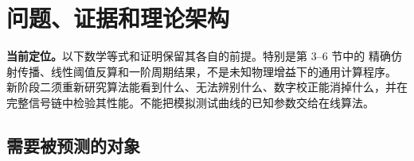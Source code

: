 \documentclass[11pt,a4paper]{ctexart}
\theoremstyle{adcplain}
\theoremstyle{definition}
\begin{document}
\begin{abstract}
这是旧三阶段路线的条件性理论底稿。四阶段新路线把完整逐级信号链和数字校准
闭环合入新的阶段二，并把真实模拟增益对在线算法未知作为基本问题。
本文中的合成模拟分段一次传输、辅路仿射副本和一阶建立均是另加的研究条件，
不能从旧实验的一致性推出实际芯片遵循这些条件。新理论的可辨识性、性能范围与
一般收敛保证尚待建立；本文不是这些问题的已完成答案。

本文建立一条从流水线 ADC 结构到性能指标的可解释理论链。ADC 首先被表示为
带逐级判决和连续内部电压的系统；在静态极限下，各级判决阈值把 ADC 输入域
划分为判决码固定的区间；区间内部的残余电压由所选模拟传输决定，仅在额外采用
局部分段一次模拟近似时才对输入呈一次关系。码宽、DNL、累计码密度
偏差、单调条件下的转换电平 INL、缺失码与
发生模拟过载或最终数字裁剪的输入宽度由这些区间计算。对周期输入，进一步找出各码对应的正弦
相位范围并积分，可得到傅里叶系数，再由谱线功率计算 ADC 性能指标。
动态层从连续时间建立方程推导离散状态递推、唯一周期稳态及静态极限，
并把采样时差、随机抖动、孔径和弱非线性记忆放在相互可区分的物理入口中。
现有静态与一阶动态行为验证首先采用第一级辅路由主路输出按固定增益和偏置计算的
简化模型；现已将独立线性辅路、沿各自路径反算的输入端阈值及三状态周期建立作为另一个条件性
候选验证。两种候选均未识别芯片的实际复位和采样时序。

原阶段三的校准理论现并入新阶段二。本文从随机逼近的局部误差动力学推导校准状态的
均值和协方差，再通过本项目提出的“边界--内部谱灵敏度分解”传播到谱线与性能。
该分解同时计算区域内部映射变化和判决边界移动，避免用单一光滑 Jacobian 覆盖
量化跳变。文中明确区分直接借用的成熟理论、针对流水线 ADC 的适配结果，以及
尚待外部验证的项目工作理论。
\end{abstract}
\tableofcontents
\clearpage
{}

\section{问题、证据和理论架构}

\begin{scopebox}
\textbf{当前定位。}以下数学等式和证明保留其各自的前提。特别是第 3--6 节中的
精确仿射传播、线性阈值反算和一阶周期结果，不是未知物理增益下的通用计算程序。
新阶段二须重新研究算法能看到什么、无法辨别什么、数字校正能消掉什么，并在
完整信号链中检验其性能。不能把模拟测试曲线的已知参数交给在线算法。
\end{scopebox}

\subsection{需要被预测的对象}
\end{document}

